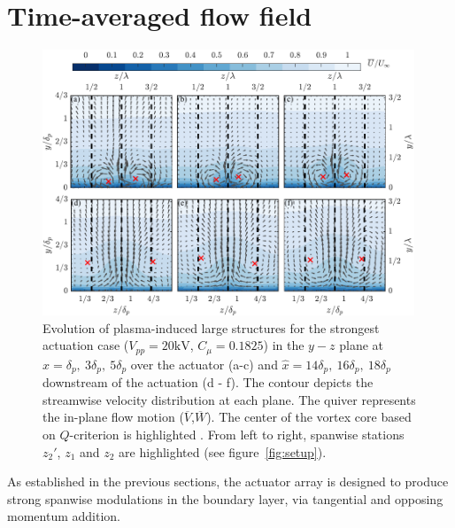 \section{Time-averaged flow field}\label{s:stereo}
%
\begin{figure}
         \centering
         \includegraphics[width=0.99\textwidth]{figures/results/stereo/stereo_rebut.pdf}
         \caption{Evolution of plasma-induced large structures for the strongest actuation case ($V_{pp} = 20 \mathrm{kV}$, $C_\mu = 0.1825$) in the $y-z$ plane at $\hat{x} = \delta_p,~3\delta_p,~5\delta_p$ over the actuator (a-c) and $\hat{x} = 14\delta_p,~16\delta_p,~18\delta_p$ downstream of the actuation (d - f). The contour depicts the streamwise velocity distribution at each plane. The quiver represents the in-plane flow motion ($\overline{V}$,$\overline{W}$). The center of the vortex core based on $Q$-criterion is highlighted .  From left to right, spanwise stations $z_2'$, $z_1$ and $z_2$ are highlighted  (see figure~\ref{fig:setup}).} \label{fig:Ucont_quiver}
\end{figure}
%
As established in the previous sections, the actuator array is designed to produce strong spanwise modulations in the boundary layer, via tangential and opposing momentum addition.

